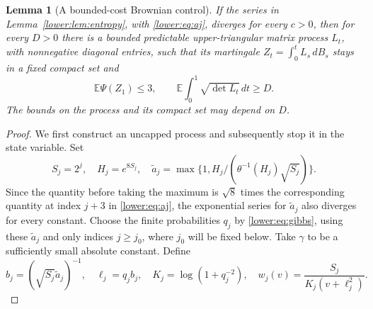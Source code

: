 \documentclass[11pt]{article}
\newtheorem{lemma}[theorem]{Lemma}
\newcommand{\E}{\mathbb E}
\numberwithin{equation}{section}
\begin{document}
\begin{lemma}[A bounded-cost Brownian control]\label{lower:lem:control}
If the series in Lemma~\ref{lower:lem:entropy}, with
\eqref{lower:eq:aj}, diverges for every \(c>0\), then for every
\(D>0\) there is a bounded predictable upper-triangular matrix process
\(L_t\), with nonnegative diagonal entries, such that its martingale
\(Z_t=\int_0^tL_s\,dB_s\) stays in a fixed compact set and
\[
 \E\Psi(Z_1)\le3,
 \qquad \E\int_0^1\sqrt{\det L_t}\,dt\ge D.
 \tag{L3}\label{lower:eq:control}
\]
The bounds on the process and its compact set may depend on \(D\).
\end{lemma}
\begin{proof}
We first construct an uncapped process and subsequently stop it in
the state variable.  Set
\[
 S_j=2^j,\quad H_j=e^{8S_j},\quad
 \widetilde a_j=\max\{1,H_j/(\theta^{-1}(H_j)\sqrt{S_j})\}.
\]
Since the quantity before taking the maximum is \(\sqrt8\) times
the corresponding quantity at index \(j+3\) in
\eqref{lower:eq:aj}, the exponential series for
\(\widetilde a_j\) also diverges for every constant.  Choose the
finite probabilities \(q_j\) by \eqref{lower:eq:gibbs}, using these
\(\widetilde a_j\) and only indices \(j\ge j_0\), where \(j_0\)
will be fixed below.  Take \(\gamma\) to be a sufficiently small
absolute constant.  Define
\[
 b_j=(\sqrt{S_j}\widetilde a_j)^{-1},\quad
 \ell_j=q_jb_j,\quad K_j=\log(1+q_j^{-2}),\quad
 w_j(v)=\frac{S_j}{K_j(v+\ell_j^2)}.
 \tag{L4}\label{lower:eq:stage}
\]


\end{proof}
\end{document}
